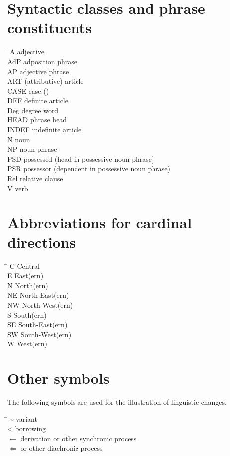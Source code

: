 \section*{Syntactic classes and phrase constituents}
\begin{tabbing}
\TABh \= \kill
{A} \> adjective\\
{AdP} \> adposition phrase\\
{AP} \> adjective phrase\\
{ART} \> (attributive) article\\
{CASE} \> case ()\\
{DEF} \> definite article\\
{Deg} \> degree word\\
{HEAD} \> phrase head\\
{INDEF} \> indefinite article\\
{N} \> noun\\
{NP} \> noun phrase\\
{PSD} \> possessed (head in possessive noun phrase)\\ 
{PSR} \> possessor (dependent in possessive noun phrase)\\
{Rel} \> relative clause\\
{V} \> verb
\end{tabbing}

\section*{Abbreviations for cardinal directions}
\begin{multicols}{2}
\begin{tabbing}
\TABh \= \kill
{C} \> Central\\
{E} \> East(ern)\\
{N} \> North(ern)\\
{NE} \> North-East(ern)\\
{NW} \> North-West(ern)\\
{S} \> South(ern)\\
{SE} \> South-East(ern)\\
{SW} \> South-West(ern)\\
{W} \> West(ern)
\end{tabbing}
\end{multicols}

\section*{Other symbols}
The following symbols are used for the illustration of linguistic changes.
\begin{tabbing}
\TABh \= \kill
\textasciitilde \> variant\\
<  \> borrowing\\
$\leftarrow$  \> derivation or other synchronic process\\
$\Leftarrow$  \>  or other diachronic process\footnotemark
\end{tabbing}

